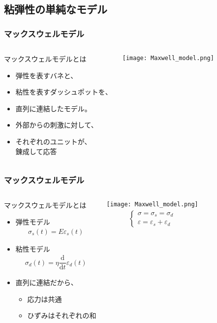 \documentclass[12pt, dvipdfmx]{beamer}
\begin{document}
\subsection{粘弾性の単純なモデル}
\begin{frame}
	\frametitle{マックスウェルモデル}
		\begin{columns}[T, onlytextwidth]
				\begin{block}{マックスウェルモデルとは}
					\begin{itemize}
						\item 弾性を表すバネと、
						\item 粘性を表すダッシュポットを、
						\item 直列に連結したモデル。
						\item 外部からの刺激に対して、
						\item それぞれのユニットが、\\錬成して応答
					\end{itemize}
				\end{block}
				\texttt{[image: Maxwell\_model.png]}
		\end{columns}
\end{frame}

\begin{frame}
	\frametitle{マックスウェルモデル}
		\begin{columns}[T, onlytextwidth]
				\begin{block}{マックスウェルモデルとは}
					\begin{itemize}
						\item 弾性モデル
						\begin{align*}
							\sigma_s(t) = E \varepsilon_s(t)
						\end{align*}
						\item 粘性モデル
						\begin{align*}
							\sigma_d(t) = \eta \dfrac{\mathrm{d}}{\mathrm{d}t}\varepsilon_d(t)
						\end{align*}
						\item 直列に連結だから、
						\begin{itemize}
							\item 応力は共通
						\item ひずみはそれぞれの和
						\end{itemize}
					\end{itemize}		
				\end{block}
				\vspace{3mm}
				\texttt{[image: Maxwell\_model.png]}
				\begin{align*}
					\begin{cases}
						\sigma = \sigma_s = \sigma_d \\
						\varepsilon = \varepsilon_s + \varepsilon_d
					\end{cases}
				\end{align*}
		\end{columns}
\end{frame}
\end{document}
